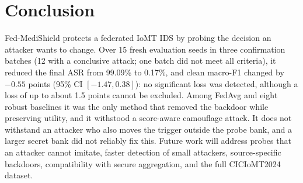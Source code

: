 \documentclass[conference]{IEEEtran}
\begin{document}
\section{Conclusion}
Fed-MediShield protects a federated IoMT IDS by probing the decision an attacker wants to change. Over 15 fresh evaluation seeds in three confirmation batches (12 with a conclusive attack; one batch did not meet all criteria), it reduced the final ASR from 99.09\% to 0.17\%, and clean macro-F1 changed by $-0.55$ points (95\% CI $[-1.47, 0.38]$): no significant loss was detected, although a loss of up to about 1.5 points cannot be excluded. Among FedAvg and eight robust baselines it was the only method that removed the backdoor while preserving utility, and it withstood a score-aware camouflage attack. It does not withstand an attacker who also moves the trigger outside the probe bank, and a larger secret bank did not reliably fix this. Future work will address probes that an attacker cannot imitate, faster detection of small attackers, source-specific backdoors, compatibility with secure aggregation, and the full CICIoMT2024 dataset.
\end{document}
